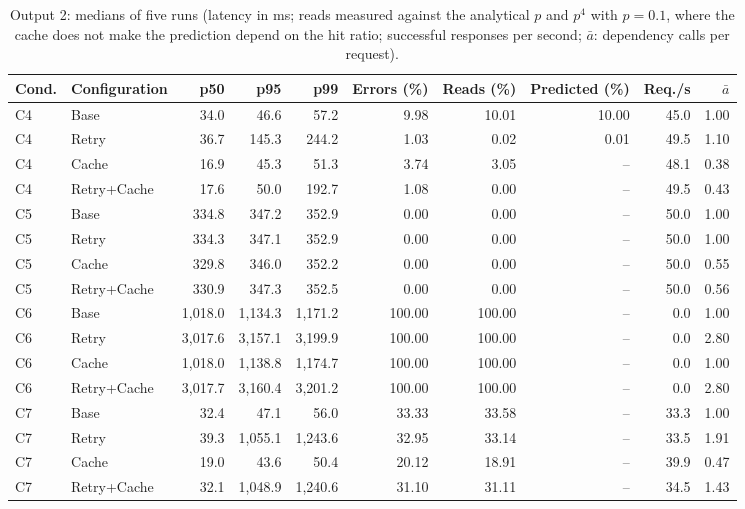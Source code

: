 \documentclass[10pt]{article}
\begin{document}
\begin{table}[htbp]
\centering
\footnotesize
\begin{tabular}{@{}llrrrrrrrr@{}}
\toprule
\textbf{Cond.} & \textbf{Configuration} & \textbf{p50} & \textbf{p95} & \textbf{p99} & \textbf{Errors (\%)} & \textbf{Reads (\%)} & \textbf{Predicted (\%)} & \textbf{Req./s} & $\bar{a}$ \\
\midrule
C4 & Base & 34.0 & 46.6 & 57.2 & 9.98 & 10.01 & 10.00 & 45.0 & 1.00 \\
C4 & Retry & 36.7 & 145.3 & 244.2 & 1.03 & 0.02 & 0.01 & 49.5 & 1.10 \\
C4 & Cache & 16.9 & 45.3 & 51.3 & 3.74 & 3.05 & -- & 48.1 & 0.38 \\
C4 & Retry+Cache & 17.6 & 50.0 & 192.7 & 1.08 & 0.00 & -- & 49.5 & 0.43 \\
\midrule
C5 & Base & 334.8 & 347.2 & 352.9 & 0.00 & 0.00 & -- & 50.0 & 1.00 \\
C5 & Retry & 334.3 & 347.1 & 352.9 & 0.00 & 0.00 & -- & 50.0 & 1.00 \\
C5 & Cache & 329.8 & 346.0 & 352.2 & 0.00 & 0.00 & -- & 50.0 & 0.55 \\
C5 & Retry+Cache & 330.9 & 347.3 & 352.5 & 0.00 & 0.00 & -- & 50.0 & 0.56 \\
\midrule
C6 & Base & 1,018.0 & 1,134.3 & 1,171.2 & 100.00 & 100.00 & -- & 0.0 & 1.00 \\
C6 & Retry & 3,017.6 & 3,157.1 & 3,199.9 & 100.00 & 100.00 & -- & 0.0 & 2.80 \\
C6 & Cache & 1,018.0 & 1,138.8 & 1,174.7 & 100.00 & 100.00 & -- & 0.0 & 1.00 \\
C6 & Retry+Cache & 3,017.7 & 3,160.4 & 3,201.2 & 100.00 & 100.00 & -- & 0.0 & 2.80 \\
\midrule
C7 & Base & 32.4 & 47.1 & 56.0 & 33.33 & 33.58 & -- & 33.3 & 1.00 \\
C7 & Retry & 39.3 & 1,055.1 & 1,243.6 & 32.95 & 33.14 & -- & 33.5 & 1.91 \\
C7 & Cache & 19.0 & 43.6 & 50.4 & 20.12 & 18.91 & -- & 39.9 & 0.47 \\
C7 & Retry+Cache & 32.1 & 1,048.9 & 1,240.6 & 31.10 & 31.11 & -- & 34.5 & 1.43 \\
\bottomrule
\end{tabular}
\caption{Output 2: medians of five runs (latency in ms; reads measured against
the analytical $p$ and $p^4$ with $p = 0.1$, where the cache does not make the
prediction depend on the hit ratio; successful responses per second; $\bar{a}$:
dependency calls per request).}
\label{tab:output2}
\end{table}
\end{document}
